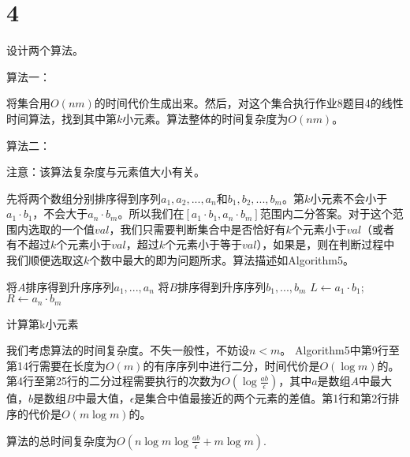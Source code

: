 \documentclass{ctexart}
\begin{document}
\section*{4}

设计两个算法。

算法一：

将集合用$O(nm)$的时间代价生成出来。然后，对这个集合执行作业8题目4的线性时间算法，找到其中第$k$小元素。算法整体的时间复杂度为$O(nm)$。




算法二：


注意：该算法复杂度与元素值大小有关。

先将两个数组分别排序得到序列$a_1,a_2,...,a_n$和$b_1,b_2,...,b_m$。第$k$小元素不会小于$a_1 \cdot b_1$，不会大于$a_n \cdot b_m$。所以我们在$[a_1 \cdot b_1 ,a_n \cdot b_m] $范围内二分答案。对于这个范围内选取的一个值$val$，我们只需要判断集合中是否恰好有$k$个元素小于$val$（或者有不超过$k$个元素小于$val$，超过$k$个元素小于等于$val$），如果是，则在判断过程中我们顺便选取这$k$个数中最大的即为问题所求。算法描述如Algorithm5。

\begin{algorithm}[H]
  \SetAlgoLined
  将$A$排序得到升序序列$a_1,...,a_n$\;
  将$B$排序得到升序序列$b_1,...,b_m$\;
  $L\leftarrow a_1 \cdot b_1$;$R\leftarrow a_n \cdot b_m$\;
  \caption{计算第k小元素}
\end{algorithm}

我们考虑算法的时间复杂度。不失一般性，不妨设$n<m$。
Algorithm5中第9行至第14行需要在长度为$O(m)$的有序序列中进行二分，时间代价是$O(\log m)$的。第4行至第25行的二分过程需要执行的次数为$O(\log\frac{ab}{\epsilon})$，其中$a$是数组$A$中最大值，$b$是数组$B$中最大值，$\epsilon$是集合中值最接近的两个元素的差值。第1行和第2行排序的代价是$O(m\log m)$的。

算法的总时间复杂度为$O(n\log m \log\frac{ab}{\epsilon} + m\log m )$.
\end{document}
